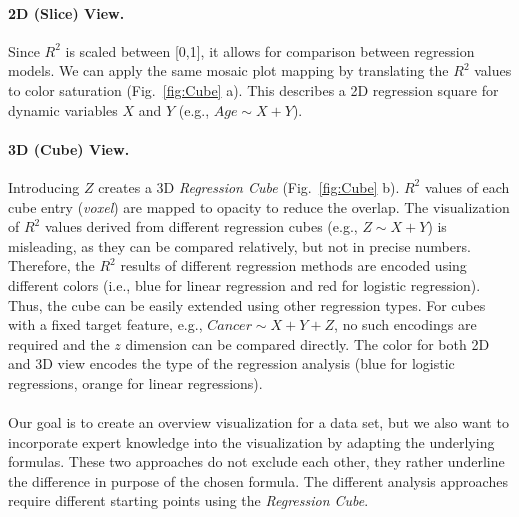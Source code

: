 \documentclass[journal]{style/vgtc} 			          %
\begin{document}
\paragraph{2D (Slice) View.}
Since $R^2$ is scaled between [0,1], it allows for comparison between regression models.
We can apply the same mosaic plot mapping by translating the $R^2$ values to color saturation (Fig.~\ref{fig:Cube} a).
This describes a 2D regression square for dynamic variables $X$ and $Y$ (e.g., $Age \sim X + Y$).

\paragraph{3D (Cube) View.}
Introducing $Z$ creates a 3D \emph{Regression Cube} (Fig.~\ref{fig:Cube} b).
$R^2$ values of each cube entry (\emph{voxel}) are mapped to opacity to reduce the overlap.
The visualization of $R^2$ values derived from different regression cubes (e.g., $Z \sim X + Y$) is misleading, as they can be compared relatively, but not in precise numbers.
Therefore, the $R^2$ results of different regression methods are encoded using different colors (i.e., blue for linear regression and red for logistic regression).
Thus, the cube can be easily extended using other regression types.
For cubes with a fixed target feature, e.g., $Cancer \sim X + Y + Z$, no such encodings are required and the $z$ dimension can be compared directly.
The color for both 2D and 3D view encodes the type of the regression analysis (blue for logistic regressions, orange for linear regressions).
\\\\
Our goal is to create an overview visualization for a data set, but we also want to incorporate expert knowledge into the visualization by adapting the underlying formulas.
These two approaches do not exclude each other, they rather underline the difference in purpose of the chosen formula.
The different analysis approaches require different starting points using the \emph{Regression Cube}.
\end{document}

